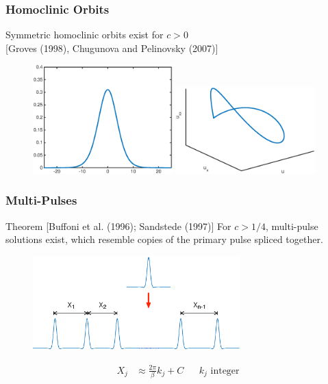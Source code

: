 \documentclass[16pt]{beamer}
\begin{document}
\begin{frame}
	\frametitle{Homoclinic Orbits}
	\fontsize{16}{7.2}\selectfont

	Symmetric homoclinic orbits exist for $c > 0$ \\ \footnotesize [Groves (1998), Chugunova and Pelinovsky (2007)]

	\begin{figure}
   		\includegraphics[width=0.48\textwidth]{images/exactsol}
   		\includegraphics[width=0.48\textwidth]{images/exactsolorbit}
	\end{figure}
\end{frame}

\begin{frame}
\frametitle{Multi-Pulses} 
	\fontsize{16}{7.2}\selectfont
    \begin{block}{Theorem [Buffoni et al. (1996); Sandstede (1997)]}
    For $c > 1/4$, multi-pulse solutions exist, which resemble copies of the primary pulse spliced together.

	\begin{figure}
	\begin{center}
	\includegraphics[width=8cm]{images/multipulse.eps}
	\end{center}
	\begin{align*}
	 X_j &\approx \frac{2 \pi}{\beta} k_j + C && k_j \text{ integer}
	\end{align*}
	\end{figure}

    \end{block}
\end{frame}
\end{document}
